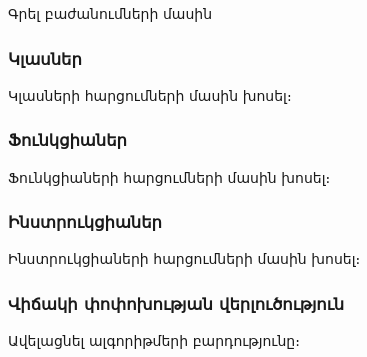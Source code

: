 {
    Գրել բաժանումների մասին

    \subsubsection*{Կլասներ}\label{subsubsec:classes}
    Կլասների հարցումների մասին խոսել։

    \subsubsection*{Ֆունկցիաներ}\label{subsubsec:functions}
    Ֆունկցիաների հարցումների մասին խոսել։

    \subsubsection*{Ինստրուկցիաներ}\label{subsubsec:instructions}
    Ինստրուկցիաների հարցումների մասին խոսել։

    \subsubsection*{Վիճակի փոփոխության վերլուծություն}\label{subsubsec:taintAnalisys}
    Ավելացնել ալգորիթմերի բարդությունը։
}